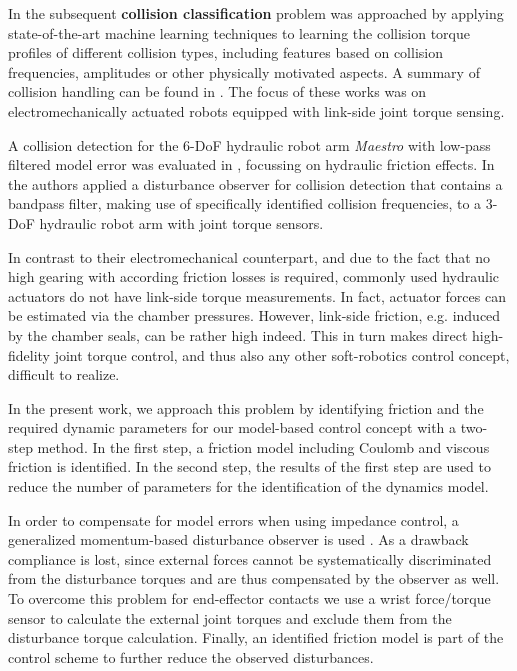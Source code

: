In \cite{GolzOseHad2015} the subsequent \textbf{collision classification} problem was approached by applying state-of-the-art machine learning techniques to learning the collision torque profiles of different collision types, including features based on collision frequencies, amplitudes or other physically motivated aspects.
A summary of collision handling can be found in \cite{Haddadin2014}.
The focus of these works was on electromechanically actuated robots equipped with link-side joint torque sensing.

A collision detection for the 6-DoF hydraulic robot arm \emph{Maestro} with low-pass filtered model error was evaluated in \cite{BidardLibArhMea2005}, focussing on hydraulic friction effects.
In \cite{jung2012collision} the authors applied a disturbance observer for collision detection that contains a bandpass filter, making use of specifically identified collision frequencies, to a 3-DoF hydraulic robot arm with joint torque sensors. 

In contrast to their electromechanical counterpart, and due to the fact that no high gearing with according friction losses is required, commonly used hydraulic actuators do not have link-side torque measurements. 
In fact, actuator forces can be estimated via the chamber pressures. 
However, link-side friction, e.g. induced by the chamber seals, can be rather high indeed.
This in turn makes direct high-fidelity joint torque control, and thus also any other soft-robotics control concept, difficult to realize.

In the present work, we approach this problem by identifying friction and the required dynamic parameters for our model-based control concept with a two-step method.
In the first step, a friction model including Coulomb and viscous friction is identified.
In the second step, the results of the first step are used to reduce the number of parameters for the identification of the dynamics model.

In order to compensate for model errors when using impedance control, a generalized momentum-based disturbance observer is used \cite{SpVdTh14}. 
As a drawback compliance is lost, since external forces cannot be systematically discriminated from the disturbance torques and are thus compensated by the observer as well.
To overcome this problem for end-effector contacts
we use a wrist force/torque sensor to calculate the external joint torques and exclude them from the disturbance torque calculation.
Finally, an identified friction model is part of the control scheme to further reduce the observed disturbances.

